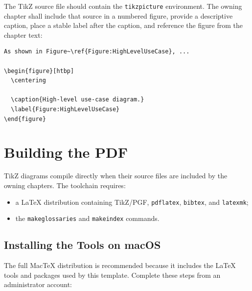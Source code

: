 The TikZ source file should contain the \texttt{tikzpicture} environment. The
owning chapter shall include that source in a numbered figure, provide a
descriptive caption, place a stable label after the caption, and reference the
figure from the chapter text:

\begin{verbatim}
As shown in Figure~\ref{Figure:HighLevelUseCase}, ...

\begin{figure}[htbp]
  \centering
  
  \caption{High-level use-case diagram.}
  \label{Figure:HighLevelUseCase}
\end{figure}
\end{verbatim}

\section{Building the PDF}

TikZ diagrams compile directly when their source files are included by the
owning chapters. The toolchain requires:

\begin{itemize}
  \item a LaTeX distribution containing TikZ/PGF, \texttt{pdflatex},
  \texttt{bibtex}, and \texttt{latexmk};
  \item the \texttt{makeglossaries} and \texttt{makeindex} commands.
\end{itemize}

\subsection{Installing the Tools on macOS}

The full MacTeX distribution is recommended because it includes the LaTeX tools and packages used by this template. Complete these steps from an administrator account:


